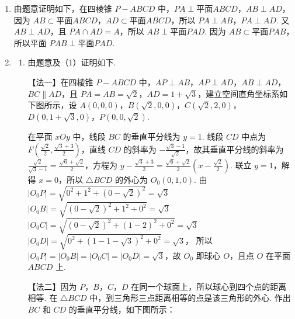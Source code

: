 \begin{solution}
\begin{enumerate}
\item 由题意证明如下，在四棱锥 \(P - ABCD\) 中，\(PA \perp \text{平面} ABCD\)，\(AB \perp AD\)，因为 \(AB \subset \text{平面} ABCD\)，\(AD \subset \text{平面} ABCD\)，所以 \(PA \perp AB\)，\(PA \perp AD\). 又 \(AB \perp AD\)，且 \(PA \cap AD = A\)，所以 \(AB \perp \text{平面} PAD\). 因为 \(AB \subset \text{平面} PAB\)，所以平面 \(PAB \perp \text{平面} PAD\).

\item
\begin{enumerate}
\item 由题意及（1）证明如下.

【法一】在四棱锥 \(P - ABCD\) 中，\(AP \perp AB\)，\(AP \perp AD\)，\(AB \perp AD\)，\(BC \parallel AD\)，且 \(PA = AB = \sqrt{2}\)，\(AD = 1 + \sqrt{3}\)，建立空间直角坐标系如下图所示，设 \(A(0,0,0)\)，\(B(\sqrt{2},0,0)\)，\(C(\sqrt{2},2,0)\)，\(D(0,1+\sqrt{3},0)\)，\(P(0,0,\sqrt{2})\).



在平面 \(xOy\) 中，线段 \(BC\) 的垂直平分线为 \(y=1\). 线段 \(CD\) 中点为 \(F\left(\frac{\sqrt{2}}{2},\frac{\sqrt{3}+3}{2}\right)\)，直线 \(CD\) 的斜率为 \(-\frac{\sqrt{3}-1}{\sqrt{2}}\)，故其垂直平分线的斜率为 \(\frac{\sqrt{2}}{\sqrt{3}-1}=\frac{\sqrt{6}+\sqrt{2}}{2}\)，方程为
\(y-\frac{\sqrt{3}+3}{2}=\frac{\sqrt{6}+\sqrt{2}}{2}\left(x-\frac{\sqrt{2}}{2}\right)\).
联立 \(y=1\)，解得 \(x=0\)，所以 \(\triangle BCD\) 的外心为 \(O_0(0,1,0)\). 由
\(
|O_0P| = \sqrt{0^2 + 1^2 + (0-\sqrt{2})^2} = \sqrt{3}
\)
\(
|O_0B| = \sqrt{(0-\sqrt{2})^2 + 1^2 + 0^2} = \sqrt{3}
\)
\(
|O_0C| = \sqrt{(0-\sqrt{2})^2 + (1-2)^2 + 0^2} = \sqrt{3}
\)
\(
|O_0D| = \sqrt{0^2 + (1-1-\sqrt{3})^2 + 0^2} = \sqrt{3}
\)，
所以 \(|O_0P|=|O_0B|=|O_0C|=|O_0D|=\sqrt{3}\)，故 \(O_0\) 即球心 \(O\)，且点 \(O\) 在平面 \(ABCD\) 上.

【法二】因为 \(P\)，\(B\)，\(C\)，\(D\) 在同一个球面上，所以球心到四个点的距离相等.
在 \(\triangle BCD\) 中，到三角形三点距离相等的点是该三角形的外心. 作出 \(BC\) 和 \(CD\) 的垂直平分线，如下图所示：



\end{enumerate}
\end{enumerate}
\end{solution}
